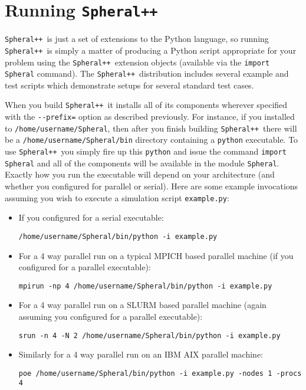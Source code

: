 \documentclass{article}
\newcommand{\Spheral}{{\tt Spheral++}}
\begin{document}
\section{Running \Spheral}
\Spheral\ is just a set of extensions to the Python language, so running \Spheral\ is simply a matter of producing a Python script appropriate for your problem using the \Spheral\ extension objects (available via the \verb+import Spheral+ command).  The \Spheral\ distribution includes several example and test scripts which demonstrate setups for several standard test cases.

When you build \Spheral\ it installs all of its components wherever specified with the \verb.--prefix=. option as described previously.  For instance, if you installed to \verb+/home/username/Spheral+, then after you finish building \Spheral\ there will be a \verb+/home/username/Spheral/bin+ directory containing a \verb+python+ executable.  To use \Spheral\ you simply fire up this \verb+python+ and issue the command \verb+import Spheral+ and all of the components will be available in the module \verb+Spheral+.  Exactly how you run the executable will depend on your architecture (and whether you configured for parallel or serial).  Here are some example invocations assuming you wish to execute a simulation script \verb+example.py+:
\begin{itemize}
\item If you configured for a serial executable:
\begin{verbatim}
/home/username/Spheral/bin/python -i example.py
\end{verbatim}
\item For a 4 way parallel run on a typical MPICH based parallel machine (if you configured for a parallel executable):
\begin{verbatim}
mpirun -np 4 /home/username/Spheral/bin/python -i example.py
\end{verbatim}
\item For a 4 way parallel run on a SLURM based parallel machine (again assuming you configured for a parallel executable):
\begin{verbatim}
srun -n 4 -N 2 /home/username/Spheral/bin/python -i example.py
\end{verbatim}
\item Similarly for a 4 way parallel run on an IBM AIX parallel machine:
\begin{verbatim}
poe /home/username/Spheral/bin/python -i example.py -nodes 1 -procs 4
\end{verbatim}
\end{itemize}
\end{document}
